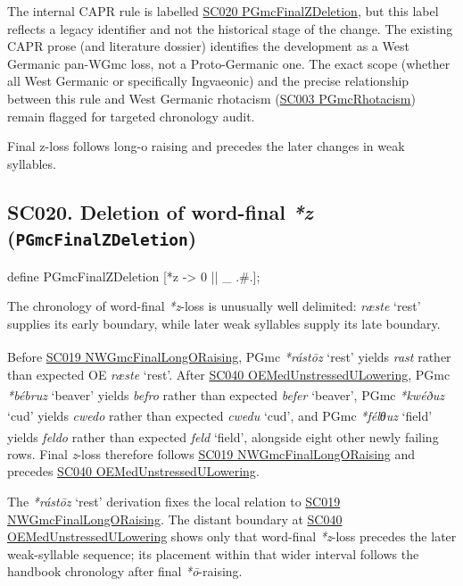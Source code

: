 \documentclass[
  british,
  a4paper,
  openany]{book}
\providecommand{\Pred}[1]{\textsuperscript{\dag}\emph{#1}}
\providecommand{\Recon}[1]{\emph{*#1}}
{\catcode`→=\active \global\def→{\ensuremath{\rightarrow}}}
\providecommand{\texorpdfstring}[2]{#1}
\providecommand{\Pred}[1]{\textsuperscript{\dag}\emph{#1}}
\providecommand{\Recon}[1]{\emph{*#1}}
{\catcode`→=\active \global\def→{\ensuremath{\rightarrow}}}
\begin{document}
The internal CAPR rule is labelled
\hyperref[rule-PGmcFinalZDeletion]{SC020 PGmcFinalZDeletion}, but this
label reflects a legacy identifier and not the historical stage of the
change. The existing CAPR prose (and literature dossier) identifies the
development as a West Germanic pan-WGmc loss, not a Proto-Germanic one.
The exact scope (whether all West Germanic or specifically Ingvaeonic)
and the precise relationship between this rule and West Germanic
rhotacism (\hyperref[rule-PGmcRhotacism]{SC003 PGmcRhotacism}) remain
flagged for targeted chronology audit.

Final z-loss follows long-o raising and precedes the later changes in
weak syllables.

\subsection{\texorpdfstring{SC020. Deletion of word-final \emph{*z}
(\texttt{PGmcFinalZDeletion})}{SC020. Deletion of word-final  (PGmcFinalZDeletion)}}\label{rule-PGmcFinalZDeletion}

\begin{ReaderFacingFoma}
define PGmcFinalZDeletion [{*z} -> 0 || _ .#.];
\end{ReaderFacingFoma}

The chronology of word-final \emph{*z}-loss is unusually well delimited:
\emph{ræste} `rest' supplies its early boundary, while later weak
syllables supply its late boundary.

Before \hyperref[rule-NWGmcFinalLongORaising]{SC019
NWGmcFinalLongORaising}, PGmc \Recon{rástōz} `rest' yields \Pred{rast}
rather than expected OE \emph{ræste} `rest'. After
\hyperref[rule-OEMedUnstressedULowering]{SC040
OEMedUnstressedULowering}, PGmc \Recon{bébruz} `beaver' yields
\Pred{befro} rather than expected \emph{befer} `beaver', PGmc
\Recon{kwéðuz} `cud' yields \Pred{cwedo} rather than expected
\emph{cwedu} `cud', and PGmc \Recon{félθuz} `field' yields \Pred{feldo}
rather than expected \emph{feld} `field', alongside eight other newly
failing rows. Final \emph{z}-loss therefore follows
\hyperref[rule-NWGmcFinalLongORaising]{SC019 NWGmcFinalLongORaising} and
precedes \hyperref[rule-OEMedUnstressedULowering]{SC040
OEMedUnstressedULowering}.

The \Recon{rástōz} `rest' derivation fixes the local relation to
\hyperref[rule-NWGmcFinalLongORaising]{SC019 NWGmcFinalLongORaising}.
The distant boundary at \hyperref[rule-OEMedUnstressedULowering]{SC040
OEMedUnstressedULowering} shows only that word-final \emph{*z}-loss
precedes the later weak-syllable sequence; its placement within that
wider interval follows the handbook chronology after final
\emph{*ō}-raising.
\end{document}
